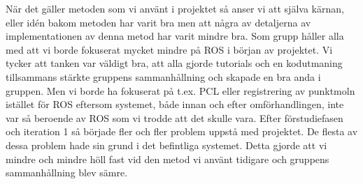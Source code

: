 När det gäller metoden som vi använt i projektet så anser vi att själva kärnan, eller idén bakom metoden har varit bra men att några av detaljerna av implementationen av denna metod har varit mindre bra. Som grupp håller alla med att vi borde fokuserat mycket mindre på ROS i början av projektet. Vi tycker att tanken var väldigt bra, att alla gjorde tutorials och en kodutmaning tillsammans stärkte gruppens sammanhållning och skapade en bra anda i gruppen. Men vi borde ha fokuserat på t.ex. PCL eller registrering av punktmoln istället för ROS eftersom systemet, både innan och efter omförhandlingen, inte var så beroende av ROS som vi trodde att det skulle vara. Efter förstudiefasen och iteration 1 så började fler och fler problem uppstå med projektet. De flesta av dessa problem hade sin grund i det befintliga systemet. Detta gjorde att vi mindre och mindre höll fast vid den metod vi använt tidigare och gruppens sammanhållning blev sämre.      





